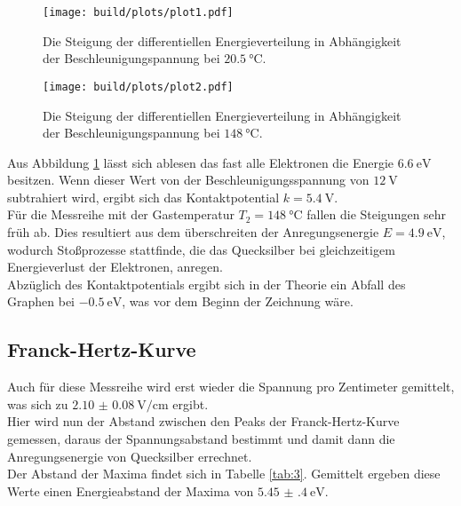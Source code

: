\begin{figure}[H]
    \centering
    \texttt{[image: build/plots/plot1.pdf]}
    \caption{Die Steigung der differentiellen Energieverteilung in Abhängigkeit der Beschleunigungspannung bei $\SI{20.5}{\celsius}$.}
    \label{img:1}
\end{figure}

\begin{figure}[H]
    \centering
    \texttt{[image: build/plots/plot2.pdf]}
    \caption{Die Steigung der differentiellen Energieverteilung in Abhängigkeit der Beschleunigungspannung bei $\SI{148}{\celsius}$.}
    \label{img:2}
\end{figure}

\noindent
Aus Abbildung \ref{img:1} lässt sich ablesen das fast alle Elektronen die Energie $\SI{6.6}{\eV}$ besitzen. 
Wenn dieser Wert von der Beschleunigungsspannung von $\SI{12}{\volt}$ subtrahiert wird, ergibt sich das Kontaktpotential $k=\SI{5.4}{\volt}$.\\
Für die Messreihe mit der Gastemperatur $T_2=\SI{148}{\celsius}$ fallen die Steigungen sehr früh ab. 
Dies resultiert aus dem überschreiten der Anregungsenergie $E=\SI{4.9}{\eV}$\cite{theo}, wodurch Stoßprozesse stattfinde, die das Quecksilber bei gleichzeitigem Energieverlust der Elektronen, anregen.\\
Abzüglich des Kontaktpotentials ergibt sich in der Theorie ein Abfall des Graphen bei $\SI{-0.5}{\eV}$, was vor dem Beginn der Zeichnung wäre.


\subsection{Franck-Hertz-Kurve}

\noindent Auch für diese Messreihe wird erst wieder die Spannung pro Zentimeter gemittelt, was sich zu $\SI{2.10(8)}{\volt\per\centi\metre}$ ergibt.\\
Hier wird nun der Abstand zwischen den Peaks der Franck-Hertz-Kurve gemessen, daraus der Spannungsabstand bestimmt und damit dann die Anregungsenergie von Quecksilber errechnet.\\
Der Abstand der Maxima findet sich in Tabelle \ref{tab:3}. Gemittelt ergeben diese Werte einen Energieabstand der Maxima von $\SI{5.45(40)}{\eV}$.

